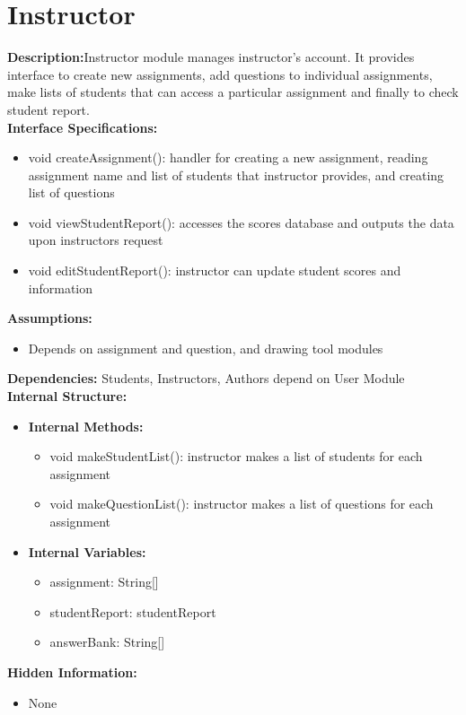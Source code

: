  

\chapter{Instructor}
\textbf{Description:}Instructor module manages instructor’s account. It provides interface to create new assignments, add questions to individual assignments, make lists of students that can access a particular assignment and finally to check student report.\\
\textbf{Interface Specifications:}
\begin{itemize}
     \item   void createAssignment(): handler for creating a new assignment, reading assignment name and list of students that instructor provides, and creating list of questions
    \item    void viewStudentReport(): accesses the scores database and outputs the data upon instructors request
    \item     void editStudentReport(): instructor can update student scores and information
\end{itemize}
\textbf{Assumptions:}
\begin{itemize}
\item Depends on assignment and question, and drawing tool modules
\end{itemize}
\textbf{Dependencies:}
Students, Instructors, Authors depend on User Module\\
\textbf{Internal Structure:}
\begin{itemize}
 \item       \textbf{Internal Methods:}
\begin{itemize}
    \item void makeStudentList(): instructor makes a list of students for each assignment
    \item void makeQuestionList(): instructor makes a list of questions for each assignment
    \end{itemize}
       \item  \textbf{Internal Variables:}
\begin{itemize}
\item assignment: String[]
 \item studentReport: studentReport
 \item answerBank: String[]
\end{itemize}
 \end{itemize}
\textbf{Hidden Information:}
\begin{itemize}
\item None
\end{itemize}
 
